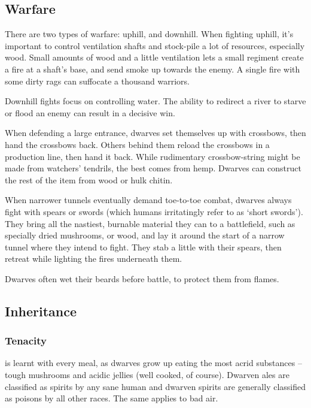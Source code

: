 \subsection{Warfare}

There are two types of warfare: uphill, and downhill.
When fighting uphill, it's important to control ventilation shafts and stock-pile a lot of resources, especially wood.
Small amounts of wood and a little ventilation lets a small regiment create a fire at a shaft's base, and send smoke up towards the enemy.
A single fire with some dirty rags can suffocate a thousand warriors.

Downhill fights focus on controlling water.
The ability to redirect a river to starve or flood an enemy can result in a decisive win.

When defending a large entrance, dwarves set themselves up with crossbows, then hand the crossbows back.
Others behind them reload the crossbows in a production line, then hand it back.
While rudimentary crossbow-string might be made from watchers' tendrils, the best comes from hemp.
Dwarves can construct the rest of the item from wood or \gls{hulk} chitin.

When narrower tunnels eventually demand toe-to-toe combat, dwarves always fight with spears or swords (which humans irritatingly refer to as `short swords').
They bring all the nastiest, burnable material they can to a battlefield, such as specially dried mushrooms, or wood, and lay it around the start of a narrow tunnel where they intend to fight.
They stab a little with their spears, then retreat while lighting the fires underneath them.

Dwarves often wet their beards before battle, to protect them from flames.

\subsection{Inheritance}

\subsubsection[Tenacity: dwarves take only half the usual penalties from rotten food, poisons, or foul air.]{Tenacity}
\label{dwarvenInheritance}
is learnt with every meal, as dwarves grow up eating the most acrid substances -- tough mushrooms and acidic jellies (well cooked, of course).
Dwarven ales are classified as spirits by any sane human and dwarven spirits are generally classified as poisons by all other races.
The same applies to bad air.

